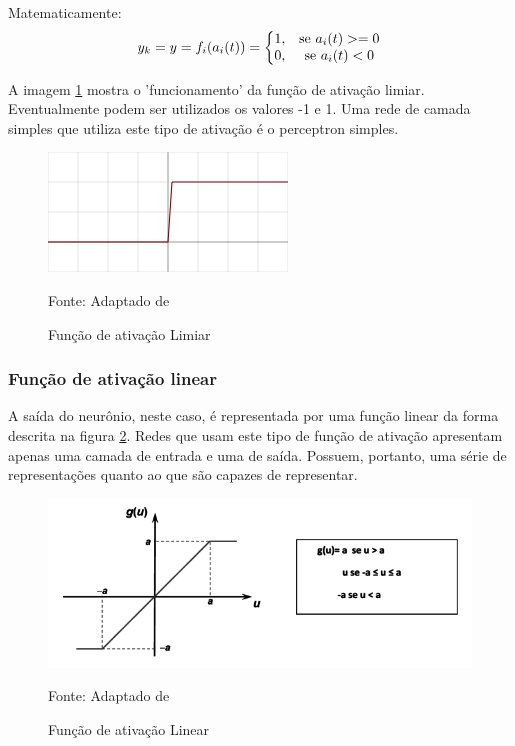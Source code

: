 Matematicamente:
\begin{equation}\label{eq:limiar}
	y_k = y = f_i(a_i(t)) = \left \{ 
	\begin{matrix} 1\textrm{,} & \mbox{\textrm{se }}a_i(t) >= 0 \\
	0\mbox{\textrm{,}} & \mbox{\textrm{se }}a_i(t) < 0 \end{matrix} 
	\right.
\end{equation}

A imagem \ref{fig:binary_step} mostra o 'funcionamento' da função de ativação limiar. Eventualmente podem ser utilizados os valores -1 e 1. Uma rede de camada simples que utiliza este tipo de ativação é o perceptron simples.

\begin{figure}[h!]
	\centering
	\includegraphics[width=.5\textwidth]{imagens/binary_step.png}	
	\caption{Função de ativação Limiar}
	{\scriptsize 	Fonte: Adaptado de \cite{haykin_redes_2001}}
	\label{fig:binary_step}
\end{figure}

\subsubsection{Função de ativação linear}\label{ativacao:linear}
A saída do neurônio, neste caso, é representada por uma função linear da forma descrita na figura 	\ref{fig:ativacao_linear}. Redes que usam este tipo de função de ativação apresentam apenas uma camada de entrada e uma de saída. Possuem, portanto, uma série de representações quanto ao que são capazes de representar. \cite{lima_ia_2016}

\begin{figure}[h!]
	\centering
	\includegraphics[width=.5\textwidth]{imagens/ativacao_linear.png}	
	\caption{Função de ativação Linear}
	{\scriptsize 	Fonte: Adaptado de \cite{haykin_redes_2001}}
	\label{fig:ativacao_linear}
\end{figure}

